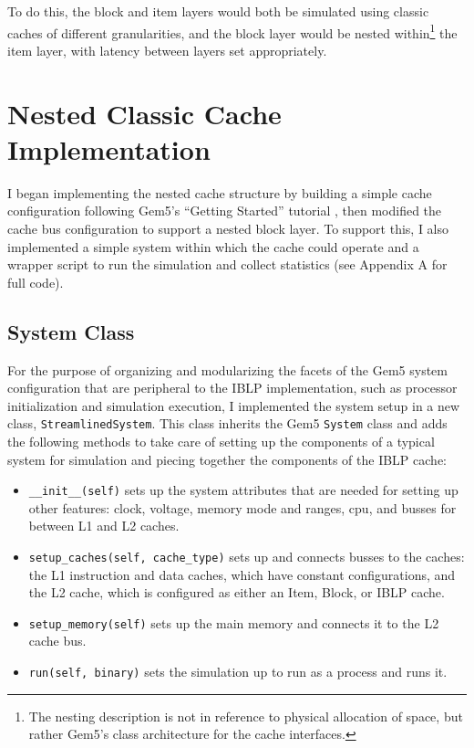 \documentclass[12pt,twoside]{reedthesis}
\begin{document}
To do this, the block and item layers would both be simulated using classic caches of different granularities, and the block layer would be nested within\footnote{The nesting description is not in reference to physical allocation of space, but rather Gem5's class architecture for the cache interfaces.} the item layer, with latency between layers set appropriately.

\section{Nested Classic Cache Implementation}

	I began implementing the nested cache structure by building a simple cache configuration following Gem5's ``Getting Started'' tutorial \cite{gem5-tutorial}, then modified the cache bus configuration to support a nested block layer. To support this, I also implemented a simple system within which the cache could operate and a wrapper script to run the simulation and collect statistics (see Appendix A for full code).

	\subsection*{System Class}

	For the purpose of organizing and modularizing the facets of the Gem5 system configuration that are peripheral to the IBLP implementation, such as processor initialization and simulation execution, I implemented the system setup in a new class, \verb`StreamlinedSystem`. This class inherits the Gem5 \verb`System` class and adds the following methods to take care of setting up the components of a typical system for simulation and piecing together the components of the IBLP cache:

	\begin{itemize}
		\item \verb`__init__(self)` sets up the system attributes that are needed for setting up other features: clock, voltage, memory mode and ranges, cpu, and busses for between L1 and L2 caches.
	
		\item \verb`setup_caches(self, cache_type)` sets up and connects busses to the caches: the L1 instruction and data caches, which have constant configurations, and the L2 cache, which is configured as either an Item, Block, or IBLP cache.
	
		\item \verb`setup_memory(self)` sets up the main memory and connects it to the L2 cache bus.
	
		\item \verb`run(self, binary)` sets the simulation up to run as a process and runs it.
	\end{itemize}
\end{document}
